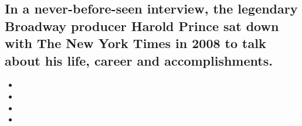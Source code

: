 \hypertarget{in-a-never-before-seen-interview-the-legendary-broadway-producer-harold-prince-sat-down-with-the-new-york-times-in-2008-to-talk-about-his-life-career-and-accomplishments-1}{%
\subsection{In a never-before-seen interview, the legendary Broadway
producer Harold Prince sat down with The New York Times in 2008 to talk
about his life, career and
accomplishments.}\label{in-a-never-before-seen-interview-the-legendary-broadway-producer-harold-prince-sat-down-with-the-new-york-times-in-2008-to-talk-about-his-life-career-and-accomplishments-1}}

\begin{itemize}
\item
\item
\item
\item
\end{itemize}

